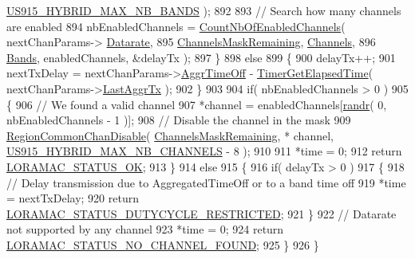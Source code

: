 \begin{DoxyCode}
      \mbox{\hyperlink{group___r_e_g_i_o_n_u_s915_h_y_b_ga1ddb8622d642ac6254b04f9020ccfcf7}{US915\_HYBRID\_MAX\_NB\_BANDS}} );
892 
893         \textcolor{comment}{// Search how many channels are enabled}
894         nbEnabledChannels = \mbox{\hyperlink{_region_u_s915-_hybrid_8c_a43fc7f3f4d15301eebe5c4a8b64b3f51}{CountNbOfEnabledChannels}}( nextChanParams->
      \mbox{\hyperlink{structs_next_chan_params_ae2f6080f3aa0e9485c55513ca56bb24d}{Datarate}},
895                                                       \mbox{\hyperlink{_region_u_s915-_hybrid_8c_a567333cec639a004655cc1717e9d0928}{ChannelsMaskRemaining}}, 
      \mbox{\hyperlink{_region_u_s915-_hybrid_8c_a2781ea69a73fdddcc54719ec4775751f}{Channels}},
896                                                       \mbox{\hyperlink{_region_u_s915-_hybrid_8c_acdf8c87a5e1e73b468dbf151f92e2273}{Bands}}, enabledChannels, &delayTx );
897     \}
898     \textcolor{keywordflow}{else}
899     \{
900         delayTx++;
901         nextTxDelay = nextChanParams->\mbox{\hyperlink{structs_next_chan_params_a3609676d2d3b7c00e25615324b35cb26}{AggrTimeOff}} - 
      \mbox{\hyperlink{time_server_8c_a9ca7e27f3d6474daff63f2e093a2e91e}{TimerGetElapsedTime}}( nextChanParams->\mbox{\hyperlink{structs_next_chan_params_a381b728f60b185ecf3313e974c18768b}{LastAggrTx}} );
902     \}
903 
904     \textcolor{keywordflow}{if}( nbEnabledChannels > 0 )
905     \{
906         \textcolor{comment}{// We found a valid channel}
907         *channel = enabledChannels[\mbox{\hyperlink{utilities_8c_af5d8ad6dae489ac64821e7d4f004595d}{randr}}( 0, nbEnabledChannels - 1 )];
908         \textcolor{comment}{// Disable the channel in the mask}
909         \mbox{\hyperlink{group___r_e_g_i_o_n_c_o_m_m_o_n_ga695c0ab2a06edcae5b33772f639fb676}{RegionCommonChanDisable}}( \mbox{\hyperlink{_region_u_s915-_hybrid_8c_a567333cec639a004655cc1717e9d0928}{ChannelsMaskRemaining}}, *
      channel, \mbox{\hyperlink{group___r_e_g_i_o_n_u_s915_h_y_b_ga977b73cbf7a5d15e2bf543fad5f35710}{US915\_HYBRID\_MAX\_NB\_CHANNELS}} - 8 );
910 
911         *time = 0;
912         \textcolor{keywordflow}{return} \mbox{\hyperlink{group___l_o_r_a_m_a_c_gga1d18f26b344040b3ec5c3db662919661a03db5fca052313edb3823c014b653a74}{LORAMAC\_STATUS\_OK}};
913     \}
914     \textcolor{keywordflow}{else}
915     \{
916         \textcolor{keywordflow}{if}( delayTx > 0 )
917         \{
918             \textcolor{comment}{// Delay transmission due to AggregatedTimeOff or to a band time off}
919             *time = nextTxDelay;
920             \textcolor{keywordflow}{return} \mbox{\hyperlink{group___l_o_r_a_m_a_c_gga1d18f26b344040b3ec5c3db662919661a0c982ada0769ecee2e1041fb6945ddd4}{LORAMAC\_STATUS\_DUTYCYCLE\_RESTRICTED}};
921         \}
922         \textcolor{comment}{// Datarate not supported by any channel}
923         *time = 0;
924         \textcolor{keywordflow}{return} \mbox{\hyperlink{group___l_o_r_a_m_a_c_gga1d18f26b344040b3ec5c3db662919661a393266a9952cf6617917f1fce181efcd}{LORAMAC\_STATUS\_NO\_CHANNEL\_FOUND}};
925     \}
926 \}
\end{DoxyCode}
